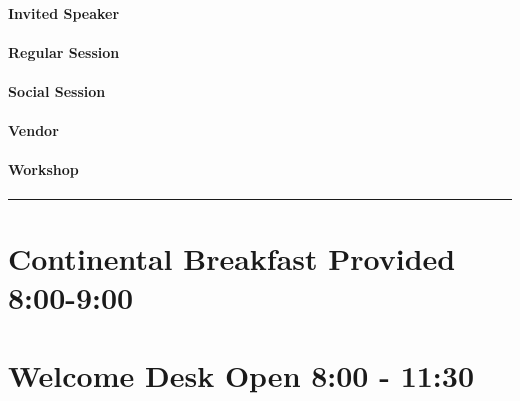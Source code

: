 \documentclass[
]{book}
\begin{document}
\begin{speaker}
\hypertarget{invited-speaker}{%
\paragraph{Invited Speaker}\label{invited-speaker}}
\end{speaker}

\begin{session}
\hypertarget{regular-session}{%
\paragraph{Regular Session}\label{regular-session}}
\end{session}
\begin{social}
\hypertarget{social-session}{%
\paragraph{Social Session}\label{social-session}}
\end{social}
\begin{vendor}
\hypertarget{vendor}{%
\paragraph{Vendor}\label{vendor}}
\end{vendor}

\begin{workshop}
\hypertarget{workshop}{%
\paragraph{Workshop}\label{workshop}}
\end{workshop}

\begin{center}\rule{0.5\linewidth}{0.5pt}\end{center}

\hypertarget{continental-breakfast-provided-800-900-1}{%
\section*{Continental Breakfast Provided \textbar{} 8:00-9:00}\label{continental-breakfast-provided-800-900-1}}

\hypertarget{welcome-desk-open-800---1130-1}{%
\section*{Welcome Desk Open \textbar{} 8:00 - 11:30}\label{welcome-desk-open-800---1130-1}}
\end{document}
